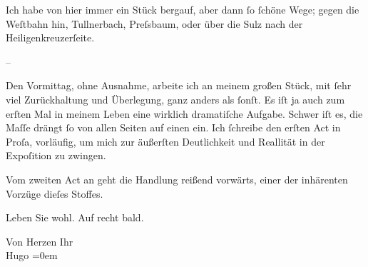 \pstart
           Ich habe von hier immer ein Stück bergauf, aber dann ſo ſchöne Wege; gegen die Weſtbahn hin, Tullnerbach, Preſsbaum, oder über die
                  Sulz nach der Heiligenkreuzerſeite.\pend
           
\pstart
           \numberlinefalse{}–\numberlinetrue{}\pend
           
\pstart
           Den Vormittag, ohne Ausnahme, arbeite ich an meinem großen Stück, mit ſehr viel Zurückhaltung und
               Überlegung, ganz anders als ſonſt. Es iſt {\pb}ja auch zum erſten Mal in meinem
               Leben eine wirklich dramatiſche Aufgabe. Schwer iſt es, die Maſſe drängt ſo von allen
               Seiten auf einen ein. Ich ſchreibe den erſten Act in Proſa, vorläufig, um mich zur
               äußerſten Deutlichkeit und Reallität in der Expoſition zu zwingen.\pend
           
\pstart
           Vom zweiten Act an geht die Handlung reißend vorwärts, einer der inhärenten Vorzüge
               dieſes Stoffes.\pend
           
\pstart
           Leben Sie wohl. Auf recht bald.\pend
           
\pstart
           Von Herzen Ihr{\\[\baselineskip]}\spacefill\mbox{Hugo}\pend
           \leftskip=0em{}\endnumbering{}  
      
